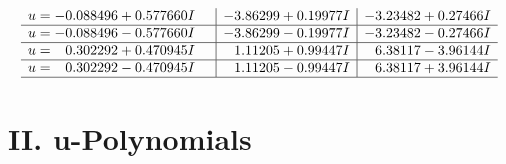 \documentclass[1p]{elsarticle_modified}
\theoremstyle{definition}
\begin{document}
$$\begin{array}{c|c|c}
\begin{aligned}
u &= -0.088496 + 0.577660 I\end{aligned}
 & -3.86299 + 0.19977 I & -3.23482 + 0.27466 I \\ \hline\begin{aligned}
u &= -0.088496 - 0.577660 I\end{aligned}
 & -3.86299 - 0.19977 I & -3.23482 - 0.27466 I \\ \hline\begin{aligned}
u &= \phantom{-}0.302292 + 0.470945 I\end{aligned}
 & \phantom{-}1.11205 + 0.99447 I & \phantom{-}6.38117 - 3.96144 I \\ \hline\begin{aligned}
u &= \phantom{-}0.302292 - 0.470945 I\end{aligned}
 & \phantom{-}1.11205 - 0.99447 I & \phantom{-}6.38117 + 3.96144 I\\
 \hline 
 \end{array}$$\newpage
\newpage\renewcommand{\arraystretch}{1}
\centering \section*{ II. u-Polynomials}
\end{document}
